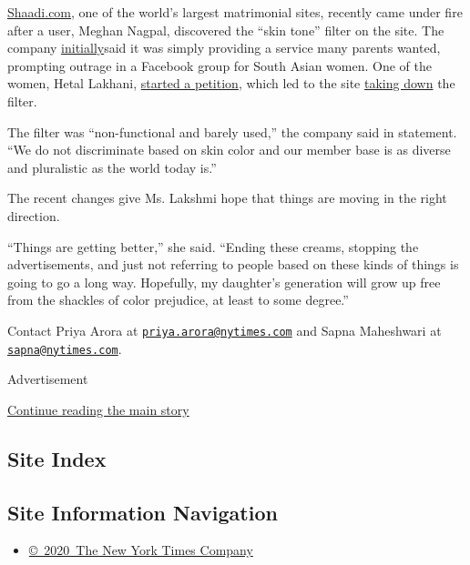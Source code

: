 \href{http://shaadi.com/}{Shaadi.com}, one of the world's largest
matrimonial sites, recently came under fire after a user, Meghan Nagpal,
discovered the ``skin tone'' filter on the site. The company
\href{https://twitter.com/MissRoshni/status/1270921151687069696}{initially}said
it was simply providing a service many parents wanted, prompting outrage
in a Facebook group for South Asian women. One of the women, Hetal
Lakhani,
\href{https://www.change.org/p/shaadi-com-remove-the-colour-filter-from-matrimonial-website}{started
a petition}, which led to the site
\href{https://twitter.com/ShaadiDotCom/status/1271024481167831040}{taking
down} the filter.

The filter was ``non-functional and barely used,'' the company said in
statement. ``We do not discriminate based on skin color and our member
base is as diverse and pluralistic as the world today is.''

The recent changes give Ms. Lakshmi hope that things are moving in the
right direction.

``Things are getting better,'' she said. ``Ending these creams, stopping
the advertisements, and just not referring to people based on these
kinds of things is going to go a long way. Hopefully, my daughter's
generation will grow up free from the shackles of color prejudice, at
least to some degree.''

Contact Priya Arora at
\href{mailto:priya.arora@nytimes.com}{\nolinkurl{priya.arora@nytimes.com}}
and Sapna Maheshwari at
\href{mailto:sapna@nytimes.com}{\nolinkurl{sapna@nytimes.com}}.

Advertisement

\protect\hyperlink{after-bottom}{Continue reading the main story}

\hypertarget{site-index}{%
\subsection{Site Index}\label{site-index}}

\hypertarget{site-information-navigation}{%
\subsection{Site Information
Navigation}\label{site-information-navigation}}

\begin{itemize}
\tightlist
\item
  \href{https://help.nytimes.com/hc/en-us/articles/115014792127-Copyright-notice}{©~2020~The
  New York Times Company}
\end{itemize}


